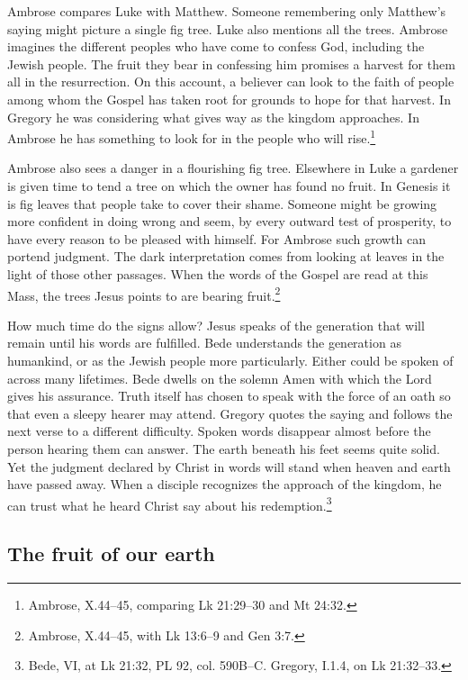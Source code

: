 Ambrose compares Luke with Matthew. Someone remembering only Matthew's saying might picture a single fig tree. Luke also mentions all the trees. Ambrose imagines the different peoples who have come to confess God, including the Jewish people. The fruit they bear in confessing him promises a harvest for them all in the resurrection. On this account, a believer can look to the faith of people among whom the Gospel has taken root for grounds to hope for that harvest. In Gregory he was considering what gives way as the kingdom approaches. In Ambrose he has something to look for in the people who will rise.\footnote{Ambrose,  X.44--45, comparing Lk 21:29--30 and Mt 24:32.}

Ambrose also sees a danger in a flourishing fig tree. Elsewhere in Luke a gardener is given time to tend a tree on which the owner has found no fruit. In Genesis it is fig leaves that people take to cover their shame. Someone might be growing more confident in doing wrong and seem, by every outward test of prosperity, to have every reason to be pleased with himself. For Ambrose such growth can portend judgment. The dark interpretation comes from looking at leaves in the light of those other passages. When the words of the Gospel are read at this Mass, the trees Jesus points to are bearing fruit.\footnote{Ambrose,  X.44--45, with Lk 13:6--9 and Gen 3:7.}

How much time do the signs allow? Jesus speaks of the generation that will remain until his words are fulfilled. Bede understands the generation as humankind, or as the Jewish people more particularly. Either could be spoken of across many lifetimes. Bede dwells on the solemn Amen with which the Lord gives his assurance. Truth itself has chosen to speak with the force of an oath so that even a sleepy hearer may attend. Gregory quotes the saying and follows the next verse to a different difficulty. Spoken words disappear almost before the person hearing them can answer. The earth beneath his feet seems quite solid. Yet the judgment declared by Christ in words will stand when heaven and earth have passed away. When a disciple recognizes the approach of the kingdom, he can trust what he heard Christ say about his redemption.\footnote{Bede,  VI, at Lk 21:32, PL 92, col. 590B--C. Gregory,  I.1.4, on Lk 21:32--33.}

\subsection{The fruit of our earth}

